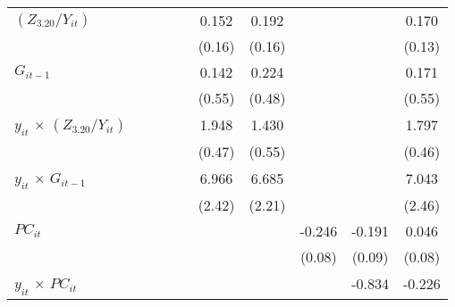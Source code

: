 \documentclass[12pt, a4paper]{article}
\begin{document}
\begin{table}[htbp]
\begin{threeparttable}
{\begin{tabular}{l*{9}{c}}
				$(Z_{3.20}/Y_{it})$          &                     &                     &                     &                     &       0.152         &       0.192         &                     &                     &       0.170         \\
				&                     &                     &                     &                     &      (0.16)         &      (0.16)         &                     &                     &      (0.13)         \\
				$G_{it-1}$            &                     &                     &                     &                     &       0.142         &       0.224         &                     &                     &       0.171         \\
				&                     &                     &                     &                     &      (0.55)         &      (0.48)         &                     &                     &      (0.55)         \\
				$y_{it}$ $\times$ $(Z_{3.20}/Y_{it})$&                     &                     &                     &                     &       1.948\sym{***}&       1.430\sym{*}  &                     &                     &       1.797\sym{***}\\
				&                     &                     &                     &                     &      (0.47)         &      (0.55)         &                     &                     &      (0.46)         \\
				$y_{it}$ $\times$ $G_{it-1}$&                     &                     &                     &                     &       6.966\sym{**} &       6.685\sym{**} &                     &                     &       7.043\sym{**} \\
				&                     &                     &                     &                     &      (2.42)         &      (2.21)         &                     &                     &      (2.46)         \\
				$PC_{it}$                &                     &                     &                     &                     &                     &                     &      -0.246\sym{**} &      -0.191\sym{*}  &       0.046         \\
				&                     &                     &                     &                     &                     &                     &      (0.08)         &      (0.09)         &      (0.08)         \\
				$y_{it}$ $\times$ $PC_{it}$ &                     &                     &                     &                     &                     &                     &                     &      -0.834\sym{*}  &      -0.226         \\

\end{tabular}}
\end{threeparttable}
\end{table}
\end{document}

